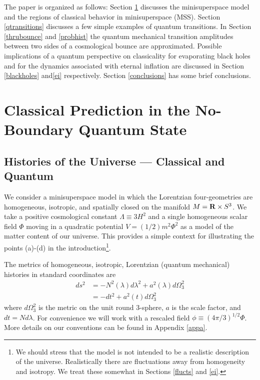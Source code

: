 \documentclass[prd,floats,superscriptaddress,eqsecnum,floatfix,nofootinbib,12pt]{revtex4}
\def\ah{a}
\def\Nh{N}
\def\jf{}
\def\j2{}
\def\tf{}
\begin{document}
The paper is organized as follows: Section \ref{model} discusses the minisuperspace model and the regions of classical behavior in minisuperspace (MSS). Section \ref{qtransitions} discusses a few simple examples of quantum transitions. In Section \ref{thrubounce} and \ref{probhist} the quantum mechanical transition amplitudes between two sides of a cosmological bounce are approximated. Possible implications of a quantum perspective on classicality for evaporating black holes and for the dynamics associated with eternal inflation are discussed in Section \ref{blackholes} and\ref{ei} {\j2 respectively.}  Section \ref{conclusions} has some brief conclusions. 

\section{Classical Prediction in the No-Boundary Quantum State}
\label{model}

\subsection{Histories of the Universe --- Classical and Quantum}
\label{histories}

We consider a minisuperspace model in which the Lorentzian four-geometries are homogeneous, isotropic, and spatially closed on the manifold $M={\bf R}\times S^3$. {\tf We take a positive cosmological constant $\Lambda \equiv 3H^2$ and a single homogeneous scalar field $\Phi$ moving in a quadratic potential $V=(1/2) m^2\Phi^2$ as a model of the matter content of our universe.} This provides a simple {\tf context} for illustrating the points (a)-(d) in the introduction\footnote{\jf We should stress that the model is not intended to be a realistic description of the universe. Realistically there are fluctuations away from homogeneity and isotropy. We treat these somewhat in Sections \ref{flucts} and \ref{ei}.}.

The metrics of homogeneous, isotropic, Lorentzian (quantum mechanical) histories in standard coordinates are 
\begin{subequations} 
\begin{align}
ds^2 &= -\Nh^2(\lambda) d\lambda^2 + \ah^2(\lambda) d\Omega^2_3  \\
           &=-dt^2  +\ah^2(t) d\Omega^2_3 
\label{homoiso}
\end{align}
\end{subequations}
where $d\Omega^2_3$ is the metric on the unit round 3-sphere, $\ah$ is the scale factor, and $dt=Nd\lambda$.  For convenience we will work with a rescaled field $\phi\equiv(4\pi/3)^{1/2}\Phi$. More details on our conventions can be found in Appendix \ref{appa}.
\end{document}
